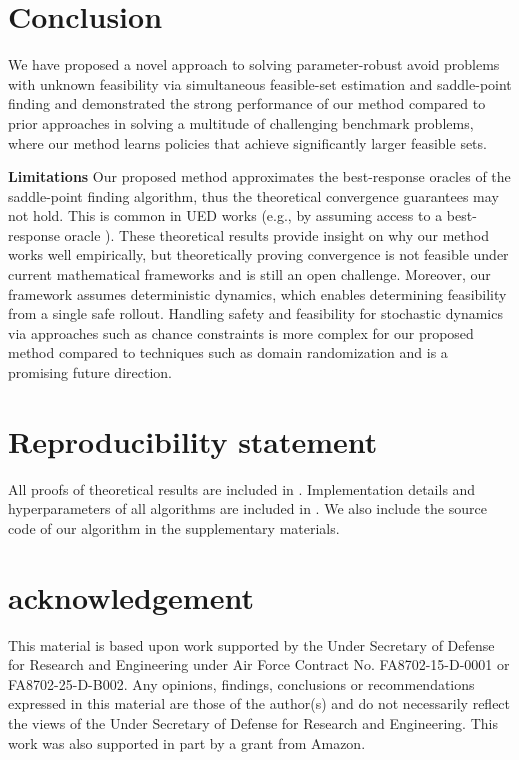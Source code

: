 \documentclass{article} %
\let\Cref\crtCref
\begin{document}
\vspace{-1em}

\section{Conclusion}
\vspace{-1em}
We have proposed a novel approach to solving parameter-robust avoid problems with unknown feasibility
via simultaneous feasible-set estimation and saddle-point finding
and demonstrated the strong performance of our method compared to prior approaches in solving a multitude of challenging benchmark problems, where our method learns policies that achieve significantly larger feasible sets.

\noindent\textbf{Limitations }
Our proposed method approximates the best-response oracles of the saddle-point finding algorithm,
thus the theoretical convergence guarantees may not hold.
This is common in UED works (e.g., by assuming access to a best-response oracle \citep{dennis2020emergent}).
These theoretical results provide insight on why our method works well empirically, but theoretically proving convergence is not feasible under current mathematical frameworks and is still an open challenge.
Moreover, our framework assumes deterministic dynamics, which enables determining feasibility from a single safe rollout. 
Handling safety and feasibility for stochastic dynamics via approaches such as chance constraints is more complex for our proposed method compared to techniques such as domain randomization and is a promising future direction.

\section{Reproducibility statement}

All proofs of theoretical results are included in \Cref{app:proof}.
Implementation details and hyperparameters of all algorithms are included in \Cref{app:experiment_details}. We also include the source code of our algorithm in the supplementary materials.


\section*{acknowledgement}
This material is based upon work supported by the Under Secretary of Defense for Research and Engineering under Air Force Contract No. FA8702-15-D-0001 or FA8702-25-D-B002. Any opinions, findings, conclusions or recommendations expressed in this material are those of the author(s) and do not necessarily reflect the views of the Under Secretary of Defense for Research and Engineering.
This work was also supported in part by a grant from Amazon.
\end{document}
